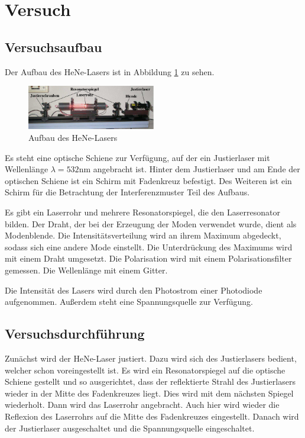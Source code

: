 \section{Versuch}
\subsection{Versuchsaufbau}
Der Aufbau des HeNe-Lasers ist in Abbildung \ref{fig:hene2} zu sehen.

\begin{figure}
	\centering
	\includegraphics[width=0.5\textwidth]{img/hene2}
	\caption{Aufbau des HeNe-Lasers \cite{V61}}
	\label{fig:hene2}
\end{figure}

\noindent Es steht eine optische Schiene zur Verfügung, auf der ein Justierlaser mit Wellenlänge \(\lambda=532\)nm angebracht ist. Hinter dem Justierlaser und am Ende der optischen Schiene ist ein Schirm mit Fadenkreuz befestigt. Des Weiteren ist ein Schirm für die Betrachtung der Interferenzmuster Teil des Aufbaus.

\noindent Es gibt ein Laserrohr und mehrere Resonatorspiegel, die den Laserresonator bilden. Der Draht, der bei der Erzeugung der Moden verwendet wurde, dient als Modenblende. Die Intensitätsverteilung wird an ihrem Maximum abgedeckt, sodass sich eine andere Mode einstellt. Die Unterdrückung des Maximums wird mit einem Draht umgesetzt. Die Polarisation wird mit einem Polarisationsfilter gemessen. Die Wellenlänge mit einem Gitter.

\noindent Die Intensität des Lasers wird durch den Photostrom einer Photodiode aufgenommen. Außerdem steht eine Spannungsquelle zur Verfügung.

\subsection{Versuchsdurchführung}
Zunächst wird der HeNe-Laser justiert. Dazu wird sich des Justierlasers bedient, welcher schon voreingestellt ist. Es wird ein Resonatorspiegel auf die optische Schiene gestellt und so ausgerichtet, dass der reflektierte Strahl des Justierlasers wieder in der Mitte des Fadenkreuzes liegt. Dies wird mit dem nächsten Spiegel wiederholt. Dann wird das Laserrohr angebracht. Auch hier wird wieder die Reflexion des Laserrohrs auf die Mitte des Fadenkreuzes eingestellt. Danach wird der Justierlaser ausgeschaltet und die Spannungsquelle eingeschaltet.

